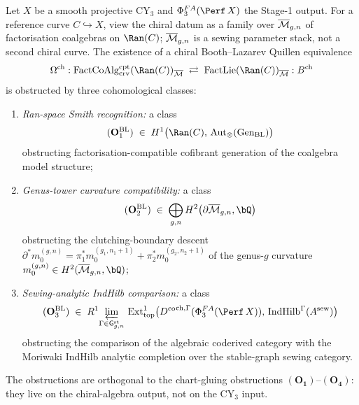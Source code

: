 \begin{conjecture}
\label{thm:chiral-output-bl-obstructions}
\ClaimStatusConjectured
Let $X$ be a smooth projective CY$_3$ and
$\Phi^{FA}_3(\Perf\,X)$ the Stage-1 output. For a reference curve
$C \hookrightarrow X$, view the chiral datum as a family over
$\overline{\mathcal{M}}_{g,n}$ of factorisation coalgebras on $\Ran(C)$; $\overline{\mathcal{M}}_{g,n}$
is a sewing parameter stack, not a second chiral curve. The existence
of a chiral Booth--Lazarev
Quillen equivalence
\[
\Omega^{\mathrm{ch}} : \FactCoAlg^{\cpt}_{\crv}(\Ran(C))_{\Mbar}
\;\rightleftarrows\;
\FactLie(\Ran(C))_{\Mbar} :B^{\mathrm{ch}}
\]
is obstructed by three cohomological classes:
\begin{enumerate}[label=\emph{$(\mathbf{O}_\arabic*^{\mathrm{BL}})$},
leftmargin=2.5em]
\item \emph{Ran-space Smith recognition:} a class
\[
(\mathbf{O}_1^{\mathrm{BL}}) \;\in\;
H^1\bigl(\Ran(C),\, \mathrm{Aut}_\otimes(\mathrm{Gen}_{\mathrm{BL}})
\bigr)
\]
obstructing factorisation-compatible cofibrant generation of
the coalgebra model structure;
\item \emph{Genus-tower curvature compatibility:} a class
\[
(\mathbf{O}_2^{\mathrm{BL}}) \;\in\;
\bigoplus_{g, n}H^2\bigl(\partial\Mbar_{g, n},\bQ\bigr)
\]
obstructing the clutching-boundary descent
$\partial^* m_0^{(g, n)} = \pi_1^* m_0^{(g_1, n_1+1)} +
\pi_2^* m_0^{(g_2, n_2+1)}$ of the genus-$g$ curvature
$m_0^{(g, n)} \in H^2(\Mbar_{g,n},\bQ)$;
\item \emph{Sewing-analytic IndHilb comparison:} a class
\[
(\mathbf{O}_3^{\mathrm{BL}}) \;\in\;
R^1\!\varprojlim_{\Gamma\in\mathsf G^{\mathrm{st}}_{g,n}}\,
\mathrm{Ext}^1_{\mathrm{top}}\bigl(
{\Dco}^{\mathrm{ch},\Gamma}(\Phi^{FA}_3(\Perf\,X)),\,
\IndHilb^\Gamma(A^{\mathrm{sew}})\bigr)
\]
obstructing the comparison of the algebraic coderived category
with the Moriwaki IndHilb analytic completion over the stable-graph
sewing category.
\end{enumerate}
\end{conjecture}

The obstructions are orthogonal to the chart-gluing obstructions
$(\mathbf{O_1})$--$(\mathbf{O_4})$: they live on the chiral-algebra
output, not on the CY$_3$ input.

